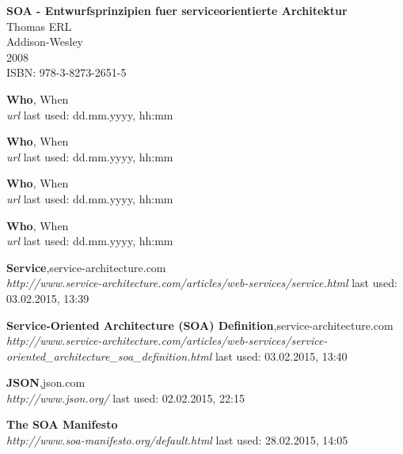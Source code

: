 \documentclass[12pt]{article}
\begin{document}
\begin{thebibliography}{56}




   \textbf{SOA - Entwurfsprinzipien fuer serviceorientierte Architektur}\\
   Thomas ERL\\
   Addison-Wesley \\
   2008 \\
	ISBN: 978-3-8273-2651-5 



 
   \textbf{Who}, When\\
  \textit{url}
  \newline last used: dd.mm.yyyy, hh:mm
 


   \textbf{Who}, When\\
  \textit{url}
  \newline last used: dd.mm.yyyy, hh:mm
 
  

	
   \textbf{Who}, When\\
  \textit{url}
  \newline last used: dd.mm.yyyy, hh:mm
  
 
   \textbf{Who}, When\\
  \textit{url}
  \newline last used: dd.mm.yyyy, hh:mm
    
  
   
 
   \textbf{Service},service-architecture.com \\
  \textit{http://www.service-architecture.com/articles/web-services/service.html}
  \newline last used: 03.02.2015, 13:39
     
     
   \textbf{Service-Oriented Architecture (SOA) Definition},service-architecture.com \\
  \textit{http://www.service-architecture.com/articles/web-services/service-oriented\_architecture\_soa\_definition.html}
  \newline last used: 03.02.2015, 13:40
     
     
  
     
    

  \textbf{JSON},json.com \\
  \textit{http://www.json.org/}
  \newline last used: 02.02.2015, 22:15

 
   \textbf{The SOA Manifesto} \\
  \textit{http://www.soa-manifesto.org/default.html}
  \newline last used: 28.02.2015, 14:05



\end{thebibliography}
\end{document}
